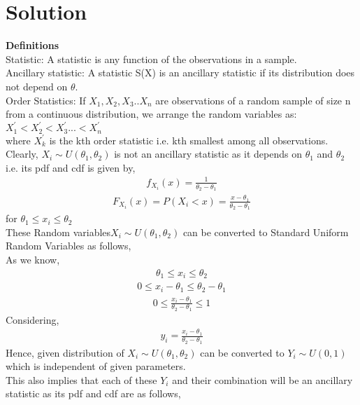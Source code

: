 \documentclass[journal,12pt,twocolumn]{IEEEtran}
\begin{document}
\section{Solution}
\textbf{Definitions}\\
Statistic: A statistic is any function of the observations in a sample.\\
Ancillary statistic: A statistic S(X) is an ancillary statistic if its distribution does not depend on $\theta$.\\
Order Statistics: If $X_{1},X_{2},X_{3}..X_{n}$ are observations of a random sample of size n from a continuous distribution, we arrange the random variables as:
$X^\prime_{1}<X^\prime_{2}<X^\prime_{3}...<X^\prime_{n}$\\
where $X^\prime_{k}$ is the kth order statistic i.e. kth smallest among all observations.
\\
Clearly, $X_{i}\sim U(\theta_{1},\theta_{2})$ is not an ancillary statistic as it depends on $\theta_{1}$ and $\theta_{2}$ i.e. its pdf and cdf is given by,
\begin{align}
     f_{X_{i}}(x) = \frac{1}{\theta_{2}-\theta_{1}}
\end{align}
\begin{align}
     F_{X_{i}}(x) =P(X_{i}<x)= \frac{x-\theta_{1}}{\theta_{2}-\theta_{1}}
\end{align}
for $\theta_{1}\leq x_{i}\leq\theta_{2}$\\
These  Random variables$X_{i}\sim U(\theta_{1},\theta_{2})$ can be converted to Standard Uniform Random Variables as follows,\\
As we know,
\begin{align}
    \theta_{1}\leq x_{i}\leq\theta_{2}
\end{align}
\begin{align}
    0\leq x_{i}-\theta_{1}\leq\theta_{2}-\theta_{1}
\end{align}
\begin{align}
    0\leq \frac{x_{i}-\theta_{1}}{\theta_{2}-\theta_{1}}\leq 1
\end{align}
Considering, 
\begin{align}
    y_{i}=\frac{x_{i}-\theta_{1}}{\theta_{2}-\theta_{1}}
\end{align}
Hence, given distribution of $X_{i}\sim U(\theta_{1},\theta_{2})$ can be converted to $Y_{i}\sim U(0,1)$ which is independent of given parameters.\\
This also implies that each of these $Y_{i}$ and their combination will be an ancillary statistic as its pdf and cdf are as follows,
\end{document}
